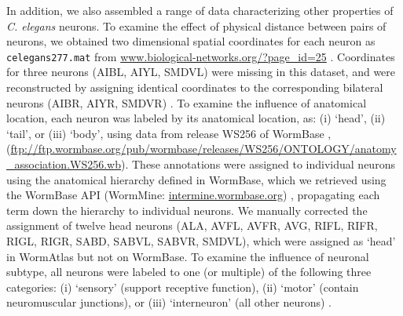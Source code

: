 \documentclass[10pt,letterpaper]{article}
\begin{document}
In addition, we also assembled a range of data characterizing other properties of \emph{C. elegans} neurons.
To examine the effect of physical distance between pairs of neurons, we obtained two dimensional spatial coordinates for each neuron as \texttt{celegans277.mat} from \url{www.biological-networks.org/?page_id=25} \cite{choe2004network}.
Coordinates for three neurons (AIBL, AIYL, SMDVL) were missing in this dataset, and were reconstructed by assigning identical coordinates to the corresponding bilateral neurons (AIBR, AIYR, SMDVR) \cite{Varier2011}.
To examine the influence of anatomical location, each neuron was labeled by its anatomical location, as:
(i) `head', (ii) `tail', or (iii) `body', using data from release WS256 of WormBase \cite{Harris:2009kd}, (\url{ftp://ftp.wormbase.org/pub/wormbase/releases/WS256/ONTOLOGY/anatomy_association.WS256.wb}).
These annotations were assigned to individual neurons using the anatomical hierarchy defined in WormBase, which we retrieved using the WormBase API (WormMine: \url{intermine.wormbase.org}) \cite{Harris:2009kd}, propagating each term down the hierarchy to individual neurons.
We manually corrected the assignment of twelve head neurons (ALA, AVFL, AVFR, AVG, RIFL, RIFR, RIGL, RIGR, SABD, SABVL, SABVR, SMDVL), which were assigned as `head' in WormAtlas \cite{WormAtlas} but not on WormBase.
To examine the influence of neuronal subtype, all neurons were labeled to one (or multiple) of the following three categories:
(i) `sensory' (support receptive function),
(ii) `motor' (contain neuromuscular junctions), or
(iii) `interneuron' (all other neurons) \cite{White:1986tx}.
\end{document}
